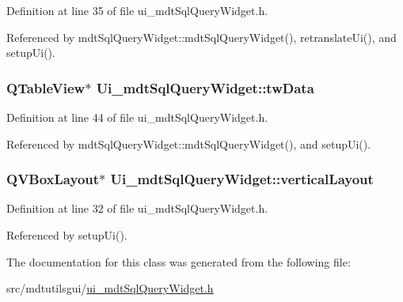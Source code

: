 Definition at line 35 of file ui\-\_\-mdt\-Sql\-Query\-Widget.\-h.



Referenced by mdt\-Sql\-Query\-Widget\-::mdt\-Sql\-Query\-Widget(), retranslate\-Ui(), and setup\-Ui().

\hypertarget{class_ui__mdt_sql_query_widget_adfcef96e9d51747e123ae65ffa30e2b7}{
\subsubsection[{tw\-Data}]{\setlength{\rightskip}{0pt plus 5cm}Q\-Table\-View$\ast$ Ui\-\_\-mdt\-Sql\-Query\-Widget\-::tw\-Data}}\label{class_ui__mdt_sql_query_widget_adfcef96e9d51747e123ae65ffa30e2b7}


Definition at line 44 of file ui\-\_\-mdt\-Sql\-Query\-Widget.\-h.



Referenced by mdt\-Sql\-Query\-Widget\-::mdt\-Sql\-Query\-Widget(), and setup\-Ui().

\hypertarget{class_ui__mdt_sql_query_widget_aa132fe9443034e8c453c3663cb8a3b86}{
\subsubsection[{vertical\-Layout}]{\setlength{\rightskip}{0pt plus 5cm}Q\-V\-Box\-Layout$\ast$ Ui\-\_\-mdt\-Sql\-Query\-Widget\-::vertical\-Layout}}\label{class_ui__mdt_sql_query_widget_aa132fe9443034e8c453c3663cb8a3b86}


Definition at line 32 of file ui\-\_\-mdt\-Sql\-Query\-Widget.\-h.



Referenced by setup\-Ui().



The documentation for this class was generated from the following file\-:\begin{DoxyCompactItemize}
\item 
src/mdtutilsgui/\hyperlink{ui__mdt_sql_query_widget_8h}{ui\-\_\-mdt\-Sql\-Query\-Widget.\-h}\end{DoxyCompactItemize}
